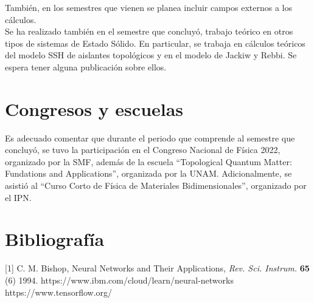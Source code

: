 \documentclass{article}
\begin{document}
También, en los semestres que vienen se planea incluir campos externos a los cálculos.\\

Se ha realizado también en el semestre que concluyó, trabajo teórico en otros tipos de sistemas de Estado Sólido. En particular, se trabaja en cálculos teóricos del modelo SSH de aislantes topológicos y en el modelo de Jackiw y Rebbi. Se espera tener alguna publicación sobre ellos.

\section{Congresos y escuelas}
Es adecuado comentar que durante el periodo que comprende al semestre que concluyó, se tuvo la participación en el Congreso Nacional de Física 2022, organizado por la SMF, además de la escuela ``Topological Quantum Matter: Fundations and Applications'', organizada por la UNAM. Adicionalmente, se asistió al ``Curso Corto de Física de Materiales Bidimensionales'', organizado por el IPN.

\section*{Bibliografía}
[1] C. M. Bishop, Neural Networks and Their Applications, \textit{Rev. Sci. Instrum.} \textbf{65} (6) 1994. \newline
[2] https://www.ibm.com/cloud/learn/neural-networks \newline
[3] https://www.tensorflow.org/
\end{document}
